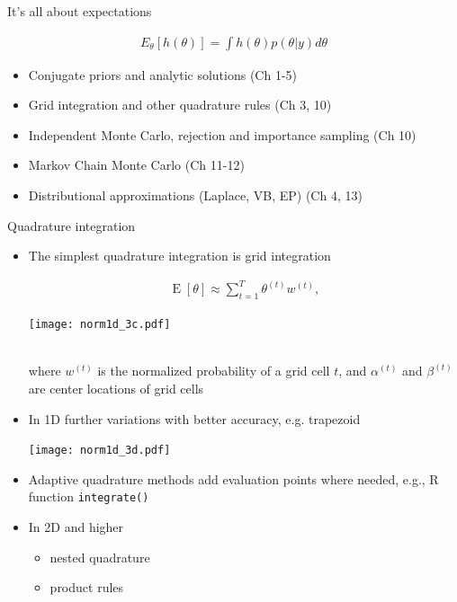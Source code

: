 \documentclass[finnish,english,t]{beamer}
\DeclareMathOperator{\E}{E}
\begin{document}
 \begin{frame}
   
  {\Large\color{navyblue} It's all about expectations}

   \begin{align*}
   E_{\theta}[h(\theta)] = \int h(\theta) p(\theta|y) d\theta
   \end{align*}

  \begin{itemize}
  \item Conjugate priors and analytic solutions (Ch 1-5)
  \item Grid integration and other quadrature rules (Ch 3, 10)
  \item Independent Monte Carlo, rejection and importance sampling (Ch 10)
  \item Markov Chain Monte Carlo (Ch 11-12)
  \item {\color{gray}Distributional approximations (Laplace, VB, EP) (Ch 4, 13)}
  \end{itemize}
   

 \end{frame}


\begin{frame}
   
  {\Large\color{navyblue} Quadrature integration}

  \begin{itemize}
  \item The simplest quadrature integration is grid integration\\
    \hspace{0cm}\begin{minipage}{3.5cm}
    \begin{align*}
      \E[\theta] \approx \sum_{t=1}^{T} \theta^{(t)}w^{(t)} ,
    \end{align*}
  \end{minipage}
  \begin{minipage}{6cm}
  \texttt{[image: norm1d\_3c.pdf]}
\end{minipage}\\
where $w^{(t)}$ is the normalized probability of a grid cell $t$, and $\alpha^{(t)}$ and $\beta^{(t)}$ are center locations of grid cells
\item<2-> In 1D further variations with better accuracy, e.g. trapezoid
  \begin{center}
    \texttt{[image: norm1d\_3d.pdf]}
  \end{center}
  \vspace{-0.7\baselineskip}
\item<3-> Adaptive quadrature methods add evaluation points where needed{\color{gray}, e.g., R function \texttt{integrate()}}
\item<4-> In 2D and higher
  \begin{itemize}
  \item nested quadrature
  \item product rules
  \end{itemize}
  \end{itemize}
  

\end{frame}
\end{document}
